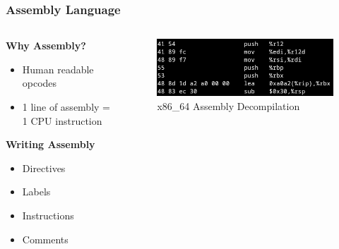\documentclass{beamer}
\begin{document}
\begin{frame}
    \frametitle{Assembly Language}
    \begin{columns}
        \begin{column}{0.55\textwidth}
			\textbf{Why Assembly?}
			\begin{itemize}
				\item Human readable opcodes
				\item 1 line of assembly = 1 CPU instruction
			\end{itemize}

			\textbf{Writing Assembly}
			\begin{itemize}
				\item Directives
				\item Labels
				\item Instructions
				\item Comments
			\end{itemize}
        \end{column}
        \begin{column}{0.4\textwidth}
			\begin{figure}
				\centering
				\includegraphics[width=\textwidth]{images/x86_binary.png}
				\caption{\small x86\_64 Assembly Decompilation}
			\end{figure}

			\vspace{0.5cm}


\end{column}
\end{columns}
\end{frame}
\end{document}
